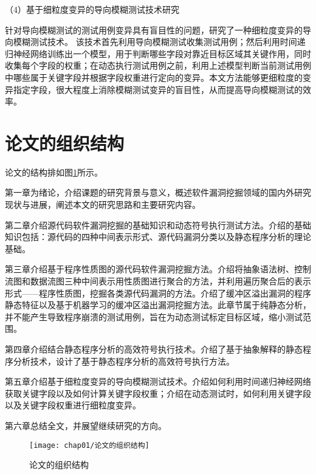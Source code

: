 （4）基于细粒度变异的导向模糊测试技术研究

针对导向模糊测试的测试用例变异具有盲目性的问题，研究了一种细粒度变异的导向模糊测试技术。
该技术首先利用导向模糊测试收集测试用例；然后利用时间递归神经网络训练出一个模型，用于判断哪些字段对靠近目标区域其关键作用，同时收集每个字段的权重；在动态执行测试用例之前，利用上述模型判断当前测试用例中哪些属于关键字段并根据字段权重进行定向的变异。本文方法能够更细粒度的变异指定字段，很大程度上消除模糊测试变异的盲目性，从而提高导向模糊测试的效率。


\section{论文的组织结构}

论文的结构排如图\ref{论文的组织结构}所示。

第一章为绪论，介绍课题的研究背景与意义，概述软件漏洞挖掘领域的国内外研究现状与进展，阐述本文的研究思路和主要研究内容。

第二章介绍源代码软件漏洞挖掘的基础知识和动态符号执行测试方法。介绍的基础知识包括：源代码的四种中间表示形式、源代码漏洞分类以及静态程序分析的理论基础。

第三章介绍基于程序性质图的源代码软件漏洞挖掘方法。介绍将抽象语法树、控制流图和数据流图三种中间表示用性质图进行聚合的方法，并利用遍历聚合后的表示形式——程序性质图，挖掘各类源代码漏洞的方法。介绍了缓冲区溢出漏洞的程序静态特征以及基于机器学习的缓冲区溢出漏洞挖掘方法。此章节属于纯静态分析，并不能产生导致程序崩溃的测试用例，旨在为动态测试标定目标区域，缩小测试范围。

第四章介绍结合静态程序分析的高效符号执行技术。介绍了基于抽象解释的静态程序分析技术，设计了基于静态程序分析的高效符号执行方法。

第五章介绍基于细粒度变异的导向模糊测试技术。介绍如何利用时间递归神经网络获取关键字段以及如何计算关键字段权重；介绍在动态测试时，如何利用关键字段以及关键字段权重进行细粒度变异。

第六章总结全文，并展望继续研究的方向。


\begin{figure}[htb]
\begin{center}
\texttt{[image: chap01/论文的组织结构]}
\end{center}
\caption{论文的组织结构}
\label{论文的组织结构}
\end{figure}
